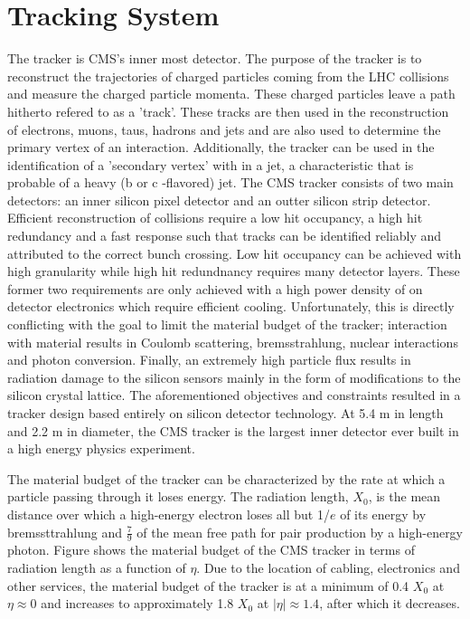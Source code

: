 \documentclass[oneside, letterpaper, 12pt, oldfontcommands]{memoir}
\begin{document}
\section{Tracking System}
The tracker is CMS's inner most detector. The purpose of the tracker is to reconstruct the
trajectories of charged particles coming from the LHC collisions and measure the charged particle momenta.
These charged particles leave a path hitherto refered to as a 'track'.%
These tracks are then used in the reconstruction of electrons, muons, taus, hadrons and jets 
and are also used to determine the primary vertex of an interaction. Additionally,
the tracker can be used in the identification of a 'secondary vertex' with in a jet,
a characteristic %
that is probable%
of a heavy (b or c -flavored) jet.
The CMS tracker consists of two main detectors: an inner silicon pixel detector and an outter
silicon strip detector.%
Efficient reconstruction of collisions require a low hit occupancy, a high hit redundancy and a
fast response such that tracks can be identified reliably and attributed to the correct bunch crossing.
Low hit occupancy can be achieved with high granularity while high hit redundnancy requires
many detector layers. These former two requirements are only achieved with a 
high power density of on detector electronics which require efficient cooling. %
Unfortunately, this is directly conflicting with the goal to limit the material 
budget of the tracker; interaction with material results in Coulomb scattering,
bremsstrahlung, nuclear interactions and photon conversion. Finally, an extremely
high particle flux results in radiation damage to the silicon sensors mainly 
in the form of modifications to the silicon crystal lattice. %
The aforementioned objectives and constraints resulted in a tracker design 
based entirely on silicon detector technology. 
At 5.4 m in length and 2.2 m in diameter, the CMS tracker is the largest inner
detector ever built in a high energy physics experiment.

The material budget of the tracker can be characterized by the rate at which a particle
passing through it loses energy. The radiation length, $X_{0}$, is the 
mean distance over which a high-energy electron loses all but 1/$e$ of its energy by bremssttrahlung %
and $\frac{7}{9}$ of the mean free path for pair production by a high-energy photon. Figure %
shows the material budget of the CMS tracker in terms of radiation length as a function of $\eta$. 
Due to the location of cabling, electronics and other services, the material budget of the 
tracker is at a minimum of 0.4 $X_{0}$ at $\eta \approx 0$ and increases to approximately 1.8 $X_{0}$
at $|\eta| \approx 1.4$, after which it decreases. 
\end{document}
